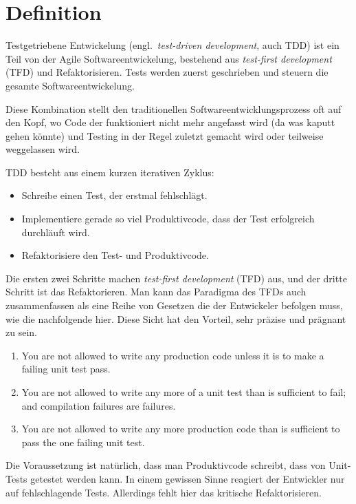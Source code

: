 \documentclass{mitschrift}
\newcommand{\bmn}{\marginpar{Benjamin\\Morgan}}
\begin{document}
\chapter{Definition}\label{Definition}\bmn
Testgetriebene Entwickelung (engl.\ \emph{test-driven development}, auch TDD)
ist ein Teil von der Agile Softwareentwickelung, bestehend aus \emph{test-first
development} (TFD) und Refaktorisieren. Tests werden zuerst geschrieben und
steuern die gesamte Softwareentwickelung. \cite{AgileData, itAgile}

Diese Kombination stellt den traditionellen Softwareentwicklungsprozess oft auf
den Kopf, wo Code der funktioniert nicht mehr angefasst wird (da was kaputt
gehen könnte) und Testing in der Regel zuletzt gemacht wird oder teilweise
weggelassen wird.

TDD besteht aus einem kurzen iterativen Zyklus:

\begin{itemize}
    \item Schreibe einen Test, der erstmal fehlschlägt.
    \item Implementiere gerade so viel Produktivcode, dass der Test erfolgreich
        durchläuft wird.
    \item Refaktorisiere den Test- und Produktivcode. \cite{itAgile}
\end{itemize}

Die ersten zwei Schritte machen \emph{test-first development} (TFD) aus, und
der dritte Schritt ist das Refaktorieren.  Man kann das Paradigma des TFDs auch
zusammenfassen als eine Reihe von Gesetzen die der Entwickeler befolgen muss,
wie die nachfolgende hier. Diese Sicht hat den Vorteil, sehr präzise und
prägnant zu sein.

\begin{enumerate}
    \item You are not allowed to write any production code unless it is to make
        a failing unit test pass.
    \item You are not allowed to write any more of a unit test than is
        sufficient to fail; and compilation failures are failures.
    \item You are not allowed to write any more production code than is
        sufficient to pass the one failing unit test. \cite{UncleBob}
\end{enumerate}

Die Voraussetzung ist natürlich, dass man Produktivcode schreibt, dass von
Unit-Tests getestet werden kann. In einem gewissen Sinne reagiert der
Entwickler nur auf fehlschlagende Tests. Allerdings fehlt hier das kritische
Refaktorisieren.
\end{document}
